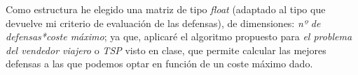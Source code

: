 Como estructura he elegido una matriz de tipo \textit{float} (adaptado al tipo que devuelve mi criterio de evaluación de las defensas), de 
dimensiones: \textit{nº de defensas*coste máximo}; ya que, aplicaré el algoritmo propuesto para \textit{el problema del vendedor viajero} o \textit{TSP} 
visto en clase, que permite calcular las mejores defensas a las que podemos optar en función de un coste máximo dado.